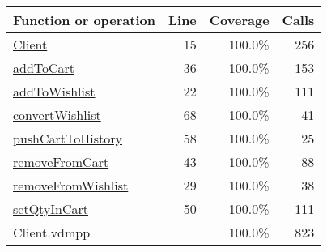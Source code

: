 \bigskip
\begin{longtable}{|l|r|r|r|}
\hline
Function or operation & Line & Coverage & Calls \\
\hline
\hline
\hyperref[Client:15]{Client} & 15&100.0\% & 256 \\
\hline
\hyperref[addToCart:36]{addToCart} & 36&100.0\% & 153 \\
\hline
\hyperref[addToWishlist:22]{addToWishlist} & 22&100.0\% & 111 \\
\hline
\hyperref[convertWishlist:68]{convertWishlist} & 68&100.0\% & 41 \\
\hline
\hyperref[pushCartToHistory:58]{pushCartToHistory} & 58&100.0\% & 25 \\
\hline
\hyperref[removeFromCart:43]{removeFromCart} & 43&100.0\% & 88 \\
\hline
\hyperref[removeFromWishlist:29]{removeFromWishlist} & 29&100.0\% & 38 \\
\hline
\hyperref[setQtyInCart:50]{setQtyInCart} & 50&100.0\% & 111 \\
\hline
\hline
Client.vdmpp & & 100.0\% & 823 \\
\hline
\end{longtable}

